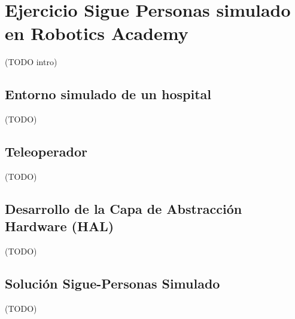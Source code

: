 \chapter{Ejercicio Sigue Personas simulado en Robotics Academy}
\label{cap:capitulo5}

(TODO intro)

\section{Entorno simulado de un hospital}
\label{sec:hospital_gazebo}

(TODO)

\section{Teleoperador}
\label{sec:teleoperador}

(TODO)

\section{Desarrollo de la Capa de Abstracción Hardware (HAL)}
\label{sec:turtlebot2_hal_simulado}

(TODO)

\section{Solución Sigue-Personas Simulado}
\label{sec:sigue_personas_simulado}

(TODO)